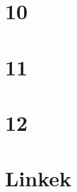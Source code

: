 \begin{spacing}{1.4}
\section*{10} \label{DBprojektharmadikharmadik10}
\Desc{

}
\vspace{0.5cm}
\newpage
\section*{11} \label{DBprojektharmadikharmadik11}
\Desc{

}
\vspace{0.5cm}
\newpage
\section*{12} \label{DBprojektharmadikharmadik12}
\Desc{

}
\vspace{0.5cm}
\newpage
\section*{Linkek} \label{DBlink}
\Desc{

}
\vspace{0.5cm}
\newpage

\end{spacing}


